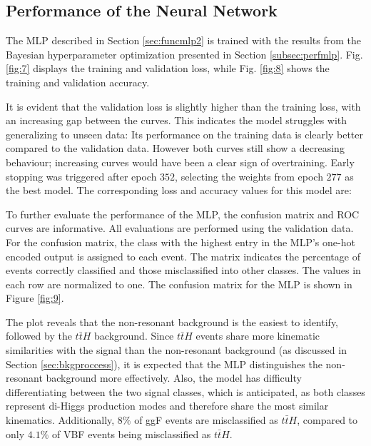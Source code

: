 \subsection{Performance of the Neural Network}
\label{subsec:perfgat}

The MLP described in Section \ref{sec:funcmlp2} is trained with the results from the Bayesian hyperparameter optimization presented in Section \ref{subsec:perfmlp}.
Fig. \ref{fig:7} displays the training and validation loss, while Fig. \ref{fig:8} shows the training and validation accuracy.


It is evident that the validation loss is slightly higher than the training loss, with an increasing gap between the curves. This indicates the model struggles with generalizing to unseen data:
Its performance on the training data is clearly better compared to the validation data.
However both curves still show a decreasing behaviour; increasing curves would have been a clear sign of overtraining.
Early stopping was triggered after epoch $352$, selecting the weights from epoch $277$ as the best model. The corresponding loss and accuracy values for this model are:


To further evaluate the performance of the MLP, the confusion matrix and ROC curves are informative. All evaluations are performed using the validation data. For the confusion matrix, 
the class with the highest entry in the MLP's one-hot encoded output is assigned to each event. The matrix indicates the percentage of events correctly classified and those misclassified into other classes.
The values in each row are normalized to one. The confusion matrix for the MLP is shown in Figure \ref{fig:9}.


The plot reveals that the non-resonant background is the easiest to identify, followed by the $t \bar{t} H$ background. Since $t \bar{t} H$ events share more kinematic similarities with the signal than
the non-resonant background (as discussed in Section \ref{sec:bkgproccess}), it is expected that the MLP distinguishes the non-resonant background more effectively. Also, the model has difficulty differentiating between
the two signal classes, which is anticipated, as both classes represent di-Higgs production modes and therefore share the most similar kinematics.
Additionally, $8\%$ of ggF events are misclassified as $t \bar{t}H$, compared to only $4.1\%$ of VBF events being misclassified as $t \bar{t}H$. \\

